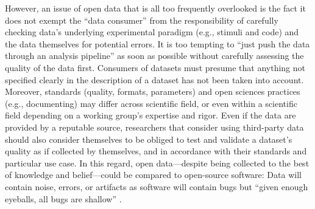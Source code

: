 However, an issue of open data that is all too frequently overlooked is the fact
it does not exempt the ``data consumer'' from the responsibility of carefully
checking data's underlying experimental paradigm (e.g., stimuli and code) and
the data themselves for potential errors.
%
It is too tempting to ``just push the data through an analysis pipeline'' as
soon as possible without carefully assessing the quality of the data first.
Consumers of datasets must presume that anything not specified clearly in the
description of a dataset has not been taken into account.
Moreover, standards (quality, formats, parameters) and open sciences practices
(e.g., documenting) may differ across scientific field, or even within a
scientific field depending on a working group's expertise and rigor.
Even if the data are provided by a reputable source, researchers that consider
using third-party data should also consider themselves to be obliged to test and
validate a dataset's quality as if collected by themselves, and in accordance
with their standards and particular use case.
%
In this regard, open data---despite being collected to the best of knowledge and
belief---could be compared to open-source software:
Data will contain noise, errors, or artifacts as software will contain bugs but
``given enough eyeballs, all bugs are shallow'' \citep[][p.
30]{raymond1999cathedral}.


